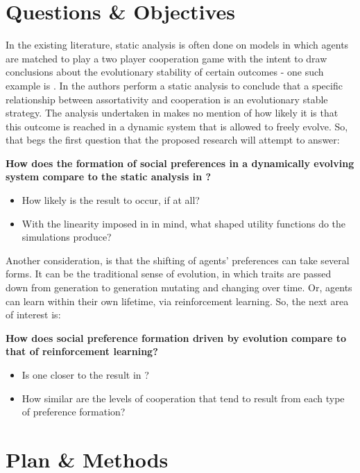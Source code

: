 \documentclass[11pt]{article}
\newcommand*{\np}{\par\noindent\newline}
\begin{document}
\section{Questions \& Objectives}\label{questions}
In the existing literature, static analysis is often done on models in which
agents are matched to play a two player cooperation game with the intent to
draw conclusions about the evolutionary stability of certain outcomes - one
such example is \cite{alger_homo_2013}. In \cite{alger_homo_2013} the authors
perform a static analysis to conclude that a specific relationship between
assortativity and cooperation is an evolutionary stable strategy. The analysis
undertaken in \cite{alger_homo_2013} makes no mention of how likely it is that
this outcome is reached in a dynamic system that is allowed to freely evolve.
So, that begs the first question that the proposed research will attempt to
answer:
\np\textbf{How does the formation of social preferences in a dynamically evolving system compare to the static analysis in \cite{alger_homo_2013}?}
\begin{itemize}
\item How likely is the \cite{alger_homo_2013} result to occur, if at all? 
\item With the linearity imposed in \cite{alger_homo_2013} in mind, what shaped utility functions do the simulations produce?
\end{itemize}
Another consideration, is that the shifting of agents' preferences can take
several forms. It can be the traditional sense of evolution, in which traits
are passed down from generation to generation mutating and changing over time.
Or, agents can learn within their own lifetime, via reinforcement learning. So,
the next area of interest is:
\np\textbf{How does social preference formation driven by evolution compare to that  of reinforcement learning?}
\begin{itemize}
\item Is one closer to the result in \cite{alger_homo_2013}?
\item How similar are the levels of cooperation that tend to result from each
type of preference formation?
\end{itemize}
\section{Plan \& Methods}
\end{document}

